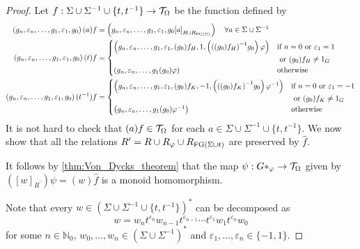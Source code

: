 \begin{proof}
  Let $f: \Sigma \cup \Sigma^{-1}\cup \{t, t^{-1}\} \rightarrow \mathcal{T}_\Omega$ be the function
  defined by
  \begin{align*}
    \left(g_n, \varepsilon_n, \ldots, g_1, \varepsilon_1, g_0\right)(a)f &=
    \left(g_n, \varepsilon_n, \ldots, g_1, \varepsilon_1, g_0 {[a]}_{R\cup R_{\textrm{FG}(\Sigma)}}\right)
    \quad\forall a\in \Sigma \cup \Sigma^{-1}\\
    \left(g_n, \varepsilon_n, \ldots, g_1, \varepsilon_1, g_0\right)(t)f &=
    \begin{cases}
      \left(g_n, \varepsilon_n, \ldots, g_1, \varepsilon_1, (g_0)f_H, 1,
      \left({\left((g_0)f_H\right)}^{-1}g_0\right)\varphi\right)
      & \textrm{if } n=0 \textrm{ or } \varepsilon_1 = 1 \\
      & \textrm{ or } (g_0)f_H \neq 1_G\\
      \left(g_n, \varepsilon_n, \ldots, g_1 (g_0)\varphi\right)
      & \textrm{otherwise}
    \end{cases}\\
    \left(g_n, \varepsilon_n, \ldots, g_1, \varepsilon_1, g_0\right)(t^{-1})f &=
    \begin{cases}
      \left(g_n, \varepsilon_n, \ldots, g_1, \varepsilon_1, (g_0)f_K, -1,
      \left({\left((g_0)f_K\right)}^{-1}g_0\right)\varphi^{-1}\right)
      & \textrm{if } n = 0 \textrm{ or }\varepsilon_1 = -1 \\
      & \textrm{ or } (g_0)f_K \neq 1_G\\
      \left(g_n, \varepsilon_n, \ldots, g_1 (g_0)\varphi^{-1}\right)
      & \textrm{otherwise}
    \end{cases}
  \end{align*}
  It is not hard to check that $(a)f\in \mathcal{T}_\Omega$ for each $a\in \Sigma\cup\Sigma^{-1}\cup \{t, t^{-1}\}$.
  We now show that all the relations $R^\prime = R\cup R_{\varphi}\cup R_{\textrm{FG}(\Sigma \cup t)}$
  are preserved by $\widehat{f}$.

  It follows by \cref{thm:Von_Dycks_theorem} that the map
  $\psi: G\ast_\varphi \rightarrow \mathcal{T}_\Omega$ given by
  $({[w]}_{R^\prime})\psi = (w)\widehat{f}$ is a monoid homomorphism.

  Note that every $w \in {(\Sigma \cup \Sigma^{-1}\cup \{t, t^{-1}\})}^\ast$
  can be decomposed as
  \[
    w = w_n t^{\varepsilon_n} w_{n-1} t^{\varepsilon_{n-1}} \cdots t^{\varepsilon_{1}}w_{1} t^{\varepsilon_n}w_0
  \]
  for some $n \in \mathbb{N}_0$, $w_0,\ldots, w_n \in {(\Sigma\cup \Sigma^{-1})}^\ast$ and
  $\varepsilon_1,\ldots, \varepsilon_n \in \{-1, 1\}$.


\end{proof}
